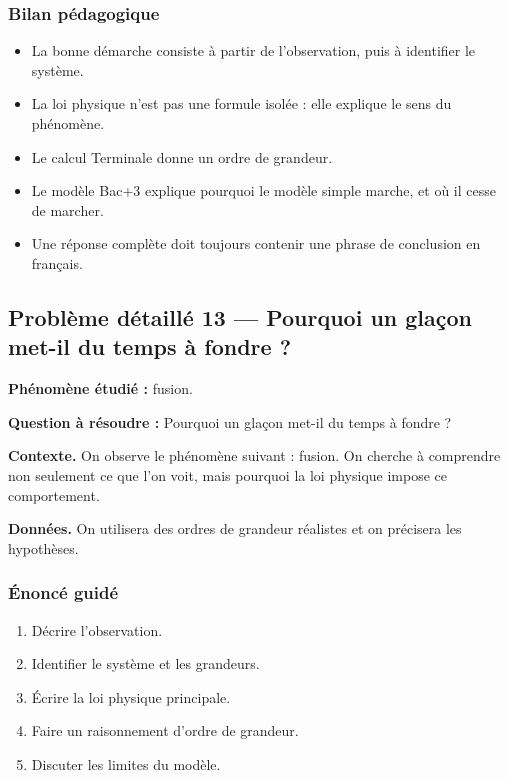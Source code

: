 \documentclass[11pt,a4paper]{article}
\begin{document}
\subsubsection*{Bilan pédagogique}

\begin{methodebox}
\begin{itemize}
  \item La bonne démarche consiste à partir de l'observation, puis à identifier le système.
  \item La loi physique n'est pas une formule isolée : elle explique le sens du phénomène.
  \item Le calcul Terminale donne un ordre de grandeur.
  \item Le modèle Bac+3 explique pourquoi le modèle simple marche, et où il cesse de marcher.
  \item Une réponse complète doit toujours contenir une phrase de conclusion en français.
\end{itemize}
\end{methodebox}

\subsection{Problème détaillé 13 — Pourquoi un glaçon met-il du temps à fondre ?}

\begin{exercicebox}
\textbf{Phénomène étudié :} fusion.

\medskip
\textbf{Question à résoudre :} Pourquoi un glaçon met-il du temps à fondre ?

\medskip
\textbf{Contexte.} On observe le phénomène suivant : fusion. On cherche à comprendre non seulement ce que l'on voit, mais pourquoi la loi physique impose ce comportement.

\medskip
\textbf{Données.} On utilisera des ordres de grandeur réalistes et on précisera les hypothèses.
\end{exercicebox}

\subsubsection*{Énoncé guidé}

\begin{enumerate}
  \item Décrire l'observation.
  \item Identifier le système et les grandeurs.
  \item Écrire la loi physique principale.
  \item Faire un raisonnement d'ordre de grandeur.
  \item Discuter les limites du modèle.
\end{enumerate}
\end{document}
